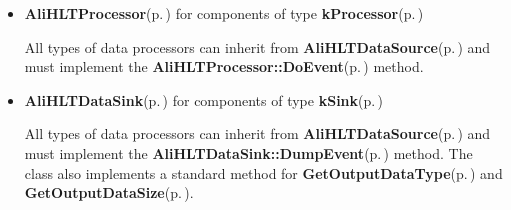 \begin{itemize}
\item {\bf Ali\-HLTProcessor}{\rm (p.\,\pageref{classAliHLTProcessor})} for components of type {\bf k\-Processor}{\rm (p.\,\pageref{classAliHLTComponent_w9w2})} \par
 All types of data processors can inherit from {\bf Ali\-HLTData\-Source}{\rm (p.\,\pageref{classAliHLTDataSource})} and must implement the {\bf Ali\-HLTProcessor::Do\-Event}{\rm (p.\,\pageref{classAliHLTProcessor_d0})} method.\end{itemize}


\begin{itemize}
\item {\bf Ali\-HLTData\-Sink}{\rm (p.\,\pageref{classAliHLTDataSink})} for components of type {\bf k\-Sink}{\rm (p.\,\pageref{classAliHLTComponent_w9w3})} \par
 All types of data processors can inherit from {\bf Ali\-HLTData\-Source}{\rm (p.\,\pageref{classAliHLTDataSource})} and must implement the {\bf Ali\-HLTData\-Sink::Dump\-Event}{\rm (p.\,\pageref{classAliHLTDataSink_d0})} method. The class also implements a standard method for {\bf Get\-Output\-Data\-Type}{\rm (p.\,\pageref{classAliHLTComponent_a11})} and {\bf Get\-Output\-Data\-Size}{\rm (p.\,\pageref{classAliHLTComponent_a12})}.\end{itemize}
